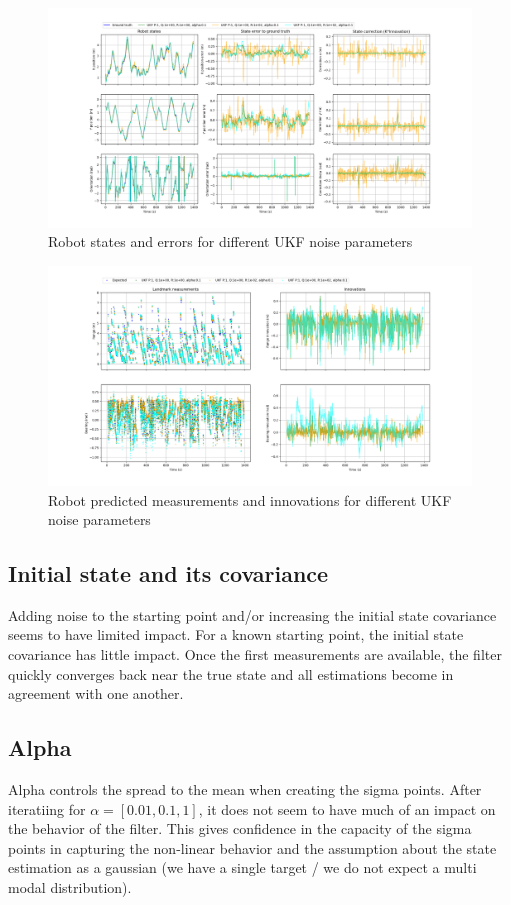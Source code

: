 \documentclass{article}
\begin{document}
\begin{figure}
\centering
\includegraphics[width=\textwidth]{Figure_7.png}
\caption{Robot states and errors for different UKF noise parameters}
\label{fig:figure7}
\end{figure}

\begin{figure}
\centering
\includegraphics[width=\textwidth]{Figure_8.png}
\caption{Robot predicted measurements and innovations for different UKF noise parameters}
\label{fig:figure8}
\end{figure}

\subsection{Initial state and its covariance}
Adding noise to the starting point and/or increasing the initial state covariance seems to have limited impact. For a known starting point, the initial state covariance has little impact. Once the first measurements are available, the filter quickly converges back near the true state and all estimations become in agreement with one another.

\subsection{Alpha}
Alpha controls the spread to the mean when creating the sigma points. After iteratiing for $\alpha=[0.01, 0.1, 1]$, it does not seem to have much of an impact on the behavior of the filter. This gives confidence in the capacity of the sigma points in capturing the non-linear behavior and the assumption about the state estimation as a gaussian (we have a single target / we do not expect a multi modal distribution).
\end{document}
